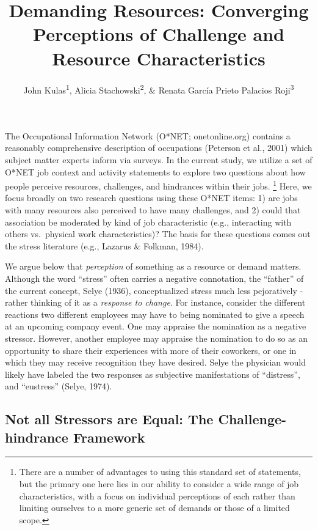 \documentclass[
  jou]{apa6}
\title{Demanding Resources: Converging Perceptions of Challenge and Resource Characteristics}
\author{John Kulas\textsuperscript{1}, Alicia Stachowski\textsuperscript{2}, \& Renata García Prieto Palacios Roji\textsuperscript{3}}
\date{}
\affiliation{\vspace{0.5cm}\textsuperscript{1} eRg\\\textsuperscript{2} University of Wisconsin - Stout\\\textsuperscript{3} PepsiCo}
\begin{document}
\maketitle

The Occupational Information Network (O*NET; onetonline.org) contains a reasonably comprehensive description of occupations (Peterson et al., 2001) which subject matter experts inform via surveys. In the current study, we utilize a set of O*NET job context and activity statements to explore two questions about how people perceive resources, challenges, and hindrances within their jobs. \footnote{There are a number of advantages to using this standard set of statements, but the primary one here lies in our ability to consider a wide range of job characteristics, with a focus on individual perceptions of each rather than limiting ourselves to a more generic set of demands or those of a limited scope.} Here, we focus broadly on two research questions using these O*NET items: 1) are jobs with many resources also perceived to have many challenges, and 2) could that association be moderated by kind of job characteristic (e.g., interacting with others vs.~physical work characteristics)? The basis for these questions comes out the stress literature (e.g., Lazarus \& Folkman, 1984).

We argue below that \emph{perception} of something as a resource or demand matters. Although the word ``stress'' often carries a negative connotation, the ``father'' of the current concept, Selye (1936), conceptualized stress much less pejoratively - rather thinking of it as a \emph{response to change}. For instance, consider the different reactions two different employees may have to being nominated to give a speech at an upcoming company event. One may appraise the nomination as a negative stressor. However, another employee may appraise the nomination to do so as an opportunity to share their experiences with more of their coworkers, or one in which they may receive recognition they have desired. Selye the physician would likely have labeled the two responses as subjective manifestations of ``distress'', and ``eustress'' (Selye, 1974).

\hypertarget{not-all-stressors-are-equal-the-challenge-hindrance-framework}{%
\subsection{Not all Stressors are Equal: The Challenge-hindrance Framework}\label{not-all-stressors-are-equal-the-challenge-hindrance-framework}}
\end{document}
